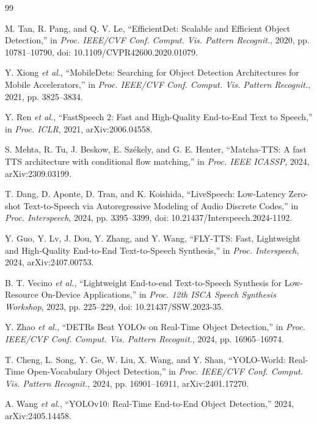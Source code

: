 \documentclass[conference]{IEEEtran}
\begin{document}
\begin{thebibliography}{99}

M. Tan, R. Pang, and Q. V. Le, ``EfficientDet: Scalable and Efficient Object Detection,'' in \textit{Proc. IEEE/CVF Conf. Comput. Vis. Pattern Recognit.}, 2020, pp. 10781--10790, doi: 10.1109/CVPR42600.2020.01079.

Y. Xiong \textit{et al.}, ``MobileDets: Searching for Object Detection Architectures for Mobile Accelerators,'' in \textit{Proc. IEEE/CVF Conf. Comput. Vis. Pattern Recognit.}, 2021, pp. 3825--3834.

Y. Ren \textit{et al.}, ``FastSpeech 2: Fast and High-Quality End-to-End Text to Speech,'' in \textit{Proc. ICLR}, 2021, arXiv:2006.04558.

S. Mehta, R. Tu, J. Beskow, E. Sz\'ekely, and G. E. Henter, ``Matcha-TTS: A fast TTS architecture with conditional flow matching,'' in \textit{Proc. IEEE ICASSP}, 2024, arXiv:2309.03199.

T. Dang, D. Aponte, D. Tran, and K. Koishida, ``LiveSpeech: Low-Latency Zero-shot Text-to-Speech via Autoregressive Modeling of Audio Discrete Codes,'' in \textit{Proc. Interspeech}, 2024, pp. 3395--3399, doi: 10.21437/Interspeech.2024-1192.

Y. Guo, Y. Lv, J. Dou, Y. Zhang, and Y. Wang, ``FLY-TTS: Fast, Lightweight and High-Quality End-to-End Text-to-Speech Synthesis,'' in \textit{Proc. Interspeech}, 2024, arXiv:2407.00753.

B. T. Vecino \textit{et al.}, ``Lightweight End-to-end Text-to-Speech Synthesis for Low-Resource On-Device Applications,'' in \textit{Proc. 12th ISCA Speech Synthesis Workshop}, 2023, pp. 225--229, doi: 10.21437/SSW.2023-35.

Y. Zhao \textit{et al.}, ``DETRs Beat YOLOs on Real-Time Object Detection,'' in \textit{Proc. IEEE/CVF Conf. Comput. Vis. Pattern Recognit.}, 2024, pp. 16965--16974.

T. Cheng, L. Song, Y. Ge, W. Liu, X. Wang, and Y. Shan, ``YOLO-World: Real-Time Open-Vocabulary Object Detection,'' in \textit{Proc. IEEE/CVF Conf. Comput. Vis. Pattern Recognit.}, 2024, pp. 16901--16911, arXiv:2401.17270.

A. Wang \textit{et al.}, ``YOLOv10: Real-Time End-to-End Object Detection,'' 2024, arXiv:2405.14458.


\end{thebibliography}
\end{document}
